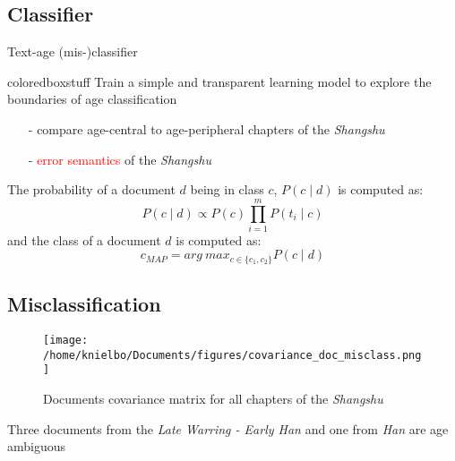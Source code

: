 \subsection{Classifier}
\begin{frame}{Text-age (mis-)classifier}
\begin{beamercolorbox}[wd=1\textwidth,sep=1em]{coloredboxstuff}
Train a simple and transparent learning model to explore the boundaries of age classification
\end{beamercolorbox}
	\begin{itemize}
		\item[-] compare age-central to age-peripheral chapters of the \emph{Shangshu}
		\item[-] \textcolor{red}{error semantics} of the \emph{Shangshu}
	\end{itemize}
\medskip
The probability of a document $d$ being in class $c$, $P(c \mid d)$ is computed as:
\begin{equation*}
P(c \mid d) \propto P(c) \prod_{i = 1}^{m}P(t_i \mid c) 
\end{equation*}
and the class of a document $d$ is computed as:\\
\begin{equation*}%
c_{MAP} = arg~max_{c \in \{c_1, c_2 \}} P(c \mid d)
\end{equation*}
\end{frame}

\subsection{Misclassification}
\begin{frame}
	\begin{figure}
		\centering
		\texttt{[image: /home/knielbo/Documents/figures/covariance\_doc\_misclass.png]}
		\caption{Documents covariance matrix for all chapters of the \emph{Shangshu}}
	\end{figure}
Three documents from the \emph{Late Warring - Early Han} and one from \emph{Han} are age ambiguous\\ 
\end{frame}

